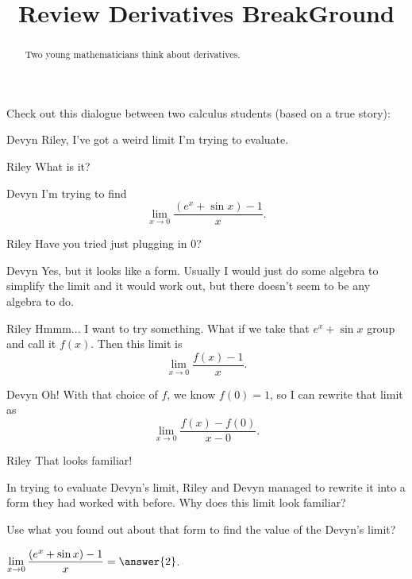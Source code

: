 \documentclass{ximera}
\title[Break-Ground:]{Review Derivatives BreakGround}
\begin{document}
\begin{abstract}
  Two young mathematicians think about derivatives.
\end{abstract}
\maketitle

Check out this dialogue between two calculus students (based on a true
story):

\begin{dialogue}
\item[Devyn] Riley, I've got a weird limit I'm trying to evaluate.
\item[Riley] What is it?
\item[Devyn] I'm trying to find \[ \lim_{x \to 0} \frac{(e^x + \sin x) - 1}{x}.\]
\item[Riley] Have you tried just plugging in $0$?
\item[Devyn] Yes, but it looks like a \zeroOverZero form.  Usually I would just do some algebra to simplify the limit and it would work out,
		but there doesn't seem to be any algebra to do.
\item[Riley] Hmmm... I want to try something.  What if we take that $e^x + \sin x$ group and call it $f(x)$.  Then this limit is
		\[ \lim_{x \to 0} \frac{f(x) - 1}{x}.\]
\item[Devyn] Oh!  With that choice of $f$, we know $f(0) = 1$, so I can rewrite that limit as
		\[ \lim_{x \to 0} \frac{f(x) - f(0)}{x-0}.\]
\item[Riley] That looks familiar!
\end{dialogue}

\begin{problem}
 In trying to evaluate Devyn's limit, Riley and Devyn managed to rewrite it into a form they had worked with before.  Why does this limit look familiar?
  \begin{multipleChoice}
  \end{multipleChoice}
\end{problem}

\begin{problem}
Use what you found out about that form to find the value of the Devyn's limit?
	\begin{prompt}
		$\displaystyle \lim_{x \to 0} \frac{(e^x + \sin x) - 1}{x} = \answer{2}$.
	\end{prompt}
\end{problem}



%
\end{document}
